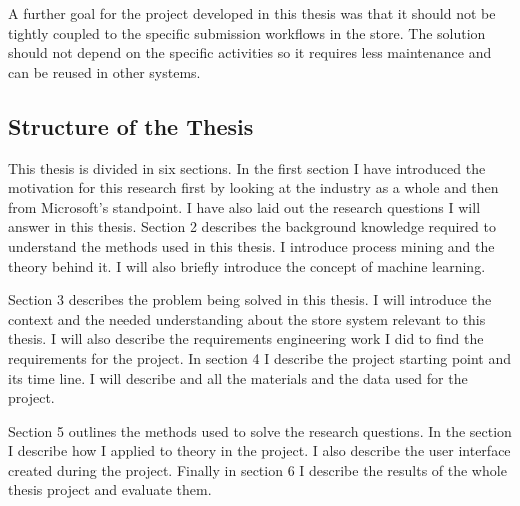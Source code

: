 A further goal for the project developed in this thesis was that it should not be tightly coupled to the 
specific submission workflows in the store. The solution should not depend on the specific activities so
it requires less maintenance and can be reused in other systems.

\subsection{Structure of the Thesis}
This thesis is divided in six sections. In the first section I have introduced the motivation for this research first by looking at the industry as a whole and then from Microsoft's standpoint.
I have also laid out the research questions I will answer in this thesis.
Section 2 describes the background knowledge required to understand the methods used in this thesis.
I introduce process mining and the theory behind it. I will also briefly introduce the concept of machine learning.

Section 3 describes the problem being solved in this thesis. I will introduce the context and the needed understanding about the store system relevant to this thesis. I will also describe the requirements engineering work I did to find the requirements for the project.
In section 4 I describe the project starting point and its time line.
I will describe and all the materials and the data used for the project.

Section 5 outlines the methods used to solve the research questions.
In the section I describe how I applied to theory in the project.
I also describe the user interface created during the project.
Finally in section 6 I describe the results of the whole thesis project and evaluate them.
